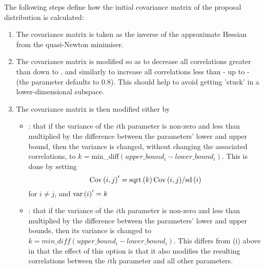 The following steps define how the initial covariance matrix of the proposal distribution is calculated:

\begin{enumerate}
\item The covariance matrix is taken as the inverse of the approximate Hessian from the quasi-Newton minimiser.

\item The covariance matrix is modified so as to decrease all correlations greater than  down to , and similarly to increase all correlations less than - up to - (the  parameter defaults to 0.8). This should help to avoid getting 'stuck' in a lower-dimensional subspace.

\item The covariance matrix is then modified either by

\begin{itemize}
\item  {}: that if the variance of the $i$th parameter is non-zero and less than  multiplied by the difference between the parameters' lower and upper bound, then the variance is changed, without changing the associated correlations, to $k=$min\_diff$(upper\_bound_i-lower\_bound_i)$. This is done by setting \[
{\mathop{\rm Cov}\nolimits} \left( {i,j} \right)^\prime   = {{{\mathop{\rm sqrt}\nolimits} \left( k \right){\mathop{\rm Cov}\nolimits} \left( {i,j} \right)} \mathord{\left/
{\vphantom {{{\mathop{\rm sqrt}\nolimits} \left( k \right){\mathop{\rm Cov}\nolimits} \left( {i,j} \right)} {{\mathop{\rm sd}\nolimits} \left( i \right)}}} \right.
\kern-\nulldelimiterspace} {{\mathop{\rm sd}\nolimits} \left( i \right)}}
\]
for $i \ne j$, and ${\mathop{\rm var}} \left( i \right)^\prime   = k$

\item {}: that if the variance of the $i$th parameter is non-zero and less than  multiplied by the difference between the parameters' lower and upper bounds, then its variance is changed to $k=min\_diff(upper\_bound_i-lower\_bound_i)$. This differs from (i) above in that the effect of this option is that it also modifies the resulting correlations between the $i$th parameter and all other parameters.
\end{itemize}


\end{enumerate}
